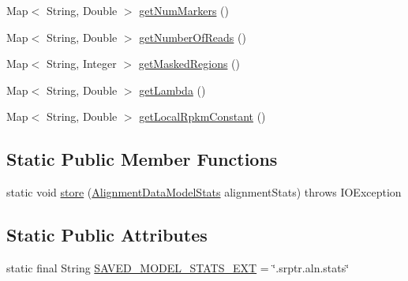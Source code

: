 \begin{DoxyCompactItemize}
\item 
Map$<$ String, Double $>$ \hyperlink{classbroad_1_1pda_1_1seq_1_1alignment_1_1_stored_alignment_stats_ad5894bb9942d01028c5ea0c5bc7e2c1e}{get\+Num\+Markers} ()
\item 
Map$<$ String, Double $>$ \hyperlink{classbroad_1_1pda_1_1seq_1_1alignment_1_1_stored_alignment_stats_a2824bb30b0cef62811543540a07070f5}{get\+Number\+Of\+Reads} ()
\item 
Map$<$ String, Integer $>$ \hyperlink{classbroad_1_1pda_1_1seq_1_1alignment_1_1_stored_alignment_stats_a7179b18f167549ff9d4275af659b18a6}{get\+Masked\+Regions} ()
\item 
Map$<$ String, Double $>$ \hyperlink{classbroad_1_1pda_1_1seq_1_1alignment_1_1_stored_alignment_stats_a37580bd68902828d1a52309bbbc591ae}{get\+Lambda} ()
\item 
Map$<$ String, Double $>$ \hyperlink{classbroad_1_1pda_1_1seq_1_1alignment_1_1_stored_alignment_stats_a80285e1a1ca002d5a00188d8f0d3b161}{get\+Local\+Rpkm\+Constant} ()
\end{DoxyCompactItemize}
\subsection*{Static Public Member Functions}
\begin{DoxyCompactItemize}
\item 
static void \hyperlink{classbroad_1_1pda_1_1seq_1_1alignment_1_1_stored_alignment_stats_ad8687679eb45fe925e14a8146735819b}{store} (\hyperlink{classbroad_1_1pda_1_1seq_1_1segmentation_1_1_alignment_data_model_stats}{Alignment\+Data\+Model\+Stats} alignment\+Stats)  throws I\+O\+Exception 
\end{DoxyCompactItemize}
\subsection*{Static Public Attributes}
\begin{DoxyCompactItemize}
\item 
static final String \hyperlink{classbroad_1_1pda_1_1seq_1_1alignment_1_1_stored_alignment_stats_a900895cff3a06f322818dd8bf97f1193}{S\+A\+V\+E\+D\+\_\+\+M\+O\+D\+E\+L\+\_\+\+S\+T\+A\+T\+S\+\_\+\+E\+X\+T} = \char`\"{}.srptr.\+aln.\+stats\char`\"{}
\end{DoxyCompactItemize}

